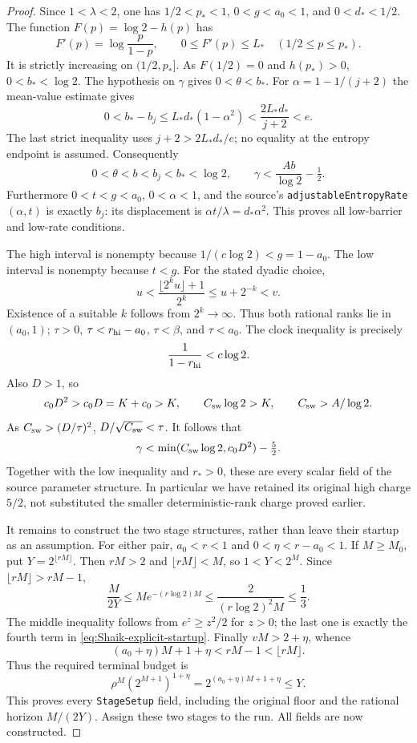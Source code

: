 \begin{proof}
Since \(1<\lambda<2\), one has \(1/2<p_*<1\),
\(0<g<a_0<1\), and \(0<d_*<1/2\).
The function \(F(p)=\log2-h(p)\) has
\[
 F'(p)=\log\frac{p}{1-p},\qquad
 0\le F'(p)\le L_* \quad (1/2\le p\le p_*).
\]
It is strictly increasing on \((1/2,p_*]\).
As \(F(1/2)=0\) and \(h(p_*)>0\),
\(0<b_*<\log2\).
The hypothesis on \(\gamma\) gives \(0<\theta<b_*\).
For \(\alpha=1-1/(j+2)\) the mean-value estimate gives
\begin{equation}\label{eq:Shaik-barrier-gap}
 0<b_*-b_j
 \le L_*d_*(1-\alpha^2)
 <\frac{2L_*d_*}{j+2}<e .
\end{equation}
The last strict inequality uses \(j+2>2L_*d_*/e\);
no equality at the entropy endpoint is assumed.
Consequently
\[
 0<\theta<b<b_j<b_*<\log2,\qquad
 \gamma<\frac{Ab}{\log2}-\tfrac12.
\]
Furthermore \(0<t<g<a_0\), \(0<\alpha<1\), and the source's
\texttt{adjustableEntropyRate}\((\alpha,t)\) is exactly \(b_j\):
its displacement is \(\alpha t/\lambda=d_*\alpha^2\).
This proves all low-barrier and low-rate conditions.

The high interval is nonempty because
\(1/(c\log2)<g=1-a_0\).
The low interval is nonempty because \(t<g\).
For the stated dyadic choice,
\[
 u<\frac{\lfloor2^ku\rfloor+1}{2^k}
 \le u+2^{-k}<v.
\]
Existence of a suitable \(k\) follows from \(2^k\to\infty\).
Thus both rational ranks lie in \((a_0,1)\);
\(\tau>0\), \(\tau<r_{\rm hi}-a_0\),
\(\tau<\beta\), and \(\tau<a_0\).
The clock inequality is precisely
\[
 \frac1{1-r_{\rm hi}}<c\log2.
\]
Also \(D>1\), so
\[
 c_0D^2>c_0D=K+c_0>K,\qquad
 C_{\rm sw}\log2>K,\qquad C_{\rm sw}>A/\log2.
\]
As \(C_{\rm sw}>(D/\tau)^2\),
\(D/\sqrt{C_{\rm sw}}<\tau\).
It follows that
\[
 \gamma<
 \min(C_{\rm sw}\log2,c_0D^2)-\tfrac52.
\]
Together with the low inequality and \(r_*>0\), these are every
scalar field of the source parameter structure. In particular we
have retained its original high charge \(5/2\), not substituted
the smaller deterministic-rank charge proved earlier.

It remains to construct the two stage structures, rather than
leave their startup as an assumption. For either pair,
\(a_0<r<1\) and \(0<\eta<r-a_0<1\).
If \(M\ge M_0\), put \(Y=2^{\lfloor rM\rfloor}\).
Then \(rM>2\) and \(\lfloor rM\rfloor<M\), so \(1<Y<2^M\).
Since \(\lfloor rM\rfloor>rM-1\),
\[
 \frac{M}{2Y}\le M e^{-(r\log2)M}
 \le\frac{2}{(r\log2)^2M}\le\frac13 .
\]
The middle inequality follows from \(e^z\ge z^2/2\) for \(z>0\);
the last one is exactly the fourth term in
\eqref{eq:Shaik-explicit-startup}.
Finally \(vM>2+\eta\), whence
\[
 (a_0+\eta)M+1+\eta<rM-1<\lfloor rM\rfloor.
\]
Thus the required terminal budget is
\[
 \rho^M(2^{M+1})^{1+\eta}
 =2^{(a_0+\eta)M+1+\eta}\le Y.
\]
This proves every \texttt{StageSetup} field, including the original
floor and the rational horizon \(M/(2Y)\). Assign these two stages
to the run. All fields are now constructed.
\end{proof}

